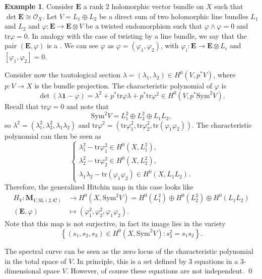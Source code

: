 \documentclass[12pt,a4paper]{book}
\theoremstyle{definition} \newtheorem{defn}[thm]{Definition}
\theoremstyle{definition} \newtheorem{ejemplo}[thm]{Example}
\theoremstyle{remark} \newtheorem{rem}[thm]{Remark}
\def\OO{\mathscr{O}}
\def\CC{\mathbf{C}}
\def\tr{\mathrm{tr}}
\def\id{\mathbf{1}}
\def\SL{\mathrm{SL}}
\def\Sym{\mathrm{Sym}}
\newcommand{\ve}[1]{\mathbf{#1}}
\let\emph\relax
\begin{document}
 \begin{ejemplo}
   Consider $\ve{E}$ a rank $2$  holomorphic vector bundle on $X$ such that $\det \ve{E} \cong \OO_X$. Let $V=L_1 \oplus L_2$ be a direct sum of two holomorphic line bundles $L_1$ and $L_2$ and $\varphi: \ve{E} \rightarrow \ve{E}\otimes V$ be a twisted endomorphism such that $\varphi \wedge \varphi = 0$ and $\tr \varphi =0$. In analogy with the case of twisting by a line bundle, we say that the pair $(\ve{E},\varphi)$ is a \emph{$V$-twisted $\SL(2,\CC)$-Higgs bundle}. We can see $\varphi$ as $\varphi=(\varphi_1,\varphi_2)$, with $\varphi_i:\ve{E} \rightarrow \ve{E} \otimes L_i$ and $[\varphi_1,\varphi_2]=0$. 
   
   Consider now the tautological section $\lambda=(\lambda_1,\lambda_2) \in H^0(V,p^*V)$, where $p:V\rightarrow X$ is the bundle projection. The characteristic polynomial of $\varphi$ is
   \begin{equation*}
     \det(\lambda \id -\varphi) = \lambda^2 + p^*\tr \varphi \lambda + p^* \tr \varphi^2 \in H^0(V,p^* \Sym^2 V).
   \end{equation*}
   Recall that $\tr \varphi=0$ and note that $$\Sym^2 V= L_1^2 \oplus L_2^2 \oplus L_1L_2, $$
   so $\lambda^2=(\lambda_1^2,\lambda_2^2, \lambda_1\lambda_2)$ and $\tr \varphi^2 = (\tr \varphi_1^2, \tr \varphi_2^2, \tr (\varphi_1 \varphi_2))$. The characteristic polynomial can then be seen as
   \begin{equation*}
     \begin{cases}
       \lambda_1^2-\tr \varphi_1^2 \in H^0(X,L_1^2), \\
       \lambda_2^2-\tr \varphi_2^2 \in H^0(X,L_2^2), \\
       \lambda_1 \lambda_2 - \tr(\varphi_1 \varphi_2) \in H^0(X,L_1L_2).
     \end{cases}
   \end{equation*}
   Therefore, the generalized Hitchin map in this case looks like
   \begin{align*}
     H_V :\mathbf{M}_{V,\SL(2,\CC)}&\longrightarrow H^0(X,\Sym^2 V) = H^0(L_1^2) \oplus H^0(L_2^2) \oplus H^0(L_1L_2)\\ 
     (\ve{E},\varphi) &\longmapsto (\varphi_1^2,\varphi_2^2,\varphi_1\varphi_2). 
     \end{align*}
     Note that this map is not surjective, in fact its image lies in the variety
     \begin{equation*}
       \left\{ (s_1,s_2,s_3) \in H^0(X,\Sym^2 V) : s_3^2 = s_1s_2 \right\}.
     \end{equation*}
     
     The spectral curve can be seen as the zero locus of the characteristic polynomial in the total space of $V$. In principle, this is a set defined by 3 equations in a 3-dimensional space $V$. However, of course these equations are not independent.
   \qed
 \end{ejemplo}
\end{document}
